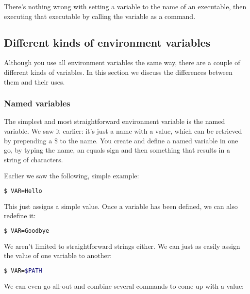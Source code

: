 There's nothing wrong with setting a variable to the name of an executable,
then executing that executable by calling the variable as a command.

\subsection{Different kinds of environment variables}
Although you use all environment variables the same way, there are a couple of
different kinds of variables. In this section we discuss the differences
between them and their uses.

\subsubsection{Named variables}
The simplest and most straightforward environment variable is the named
variable. We saw it earlier: it's just a name with a value, which can be
retrieved by prepending a \$ to the name. You create and define a named
variable in one go, by typing the name, an equals sign and then something that
results in a string of characters.

Earlier we saw the following, simple example:
\lstset{basicstyle=\scriptsize, numbers=left, captionpos=b, tabsize=4}
\begin{lstlisting}[caption=Assigning a simple value to a variable,language={bash},
xleftmargin=15pt,label=lst:Assigningasimplevaluetoavariable1]
$ VAR=Hello
\end{lstlisting}

This just assigns a simple value. Once a variable has been defined, we can also
redefine it:
\lstset{basicstyle=\scriptsize, numbers=left, captionpos=b, tabsize=4}
\begin{lstlisting}[caption=Assigning a simple value to a variable,language={bash},
xleftmargin=15pt,label=lst:Assigningasimplevaluetoavariable2]
$ VAR=Goodbye
\end{lstlisting}


We aren't limited to straightforward strings either. We can just as easily
assign the value of one variable to another:

\lstset{basicstyle=\scriptsize, numbers=left, captionpos=b, tabsize=4}
\begin{lstlisting}[caption=Assigning a simple value to a variable,language={bash},
xleftmargin=15pt,label=lst:Assigningasimplevaluetoavariable3]
$ VAR=$PATH
\end{lstlisting}


We can even go all-out and combine several commands to come up with a value:

